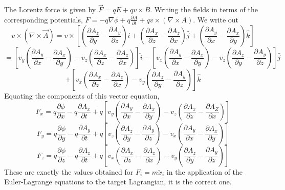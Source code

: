 \documentclass{article}
\begin{document}
The Lorentz force is given by $\vec{F}=qE+qv\times B$. Writing the fields in terms of the corresponding potentials,
$F=-q\nabla\phi+q\frac{\partial A}{\partial t}+qv\times(\nabla\times A)$.
We write out
\[v\times(\nabla\times\vec{A})=v\times\left[\left(\frac{\partial A_z}{\partial y}-\frac{\partial A_y}{\partial z}\right)\hat{i}+\left(\frac{\partial A_x}{\partial z}-\frac{\partial A_z}{\partial x}\right)\hat{j}+\left(\frac{\partial A_y}{\partial x}-\frac{\partial A_x}{\partial y}\right)\hat{k}\right]\]
\[=\left[ v_y\left(\frac{\partial A_y}{\partial x}-\frac{\partial A_x}{\partial y} \right)-v_z\left( \frac{\partial A_x}{\partial z}-\frac{\partial A_z}{\partial x} \right)\right]\hat{i}-\left[ v_x\left( \frac{\partial A_y}{\partial x}-\frac{\partial A_x}{\partial y}\right)-v_z\left(\frac{\partial A_z}{\partial y}-\frac{\partial A_y}{\partial z}\right) \right]\hat{j}\]
\[+\left[ v_x\left(  \frac{\partial A_x}{\partial z}-\frac{\partial A_z}{\partial x}\right)-v_y\left(\frac{\partial A_z}{\partial y}-\frac{\partial A_y}{\partial z}  \right) \right]\hat{k}\]
Equating the components of this vector equation,
\[F_x=q\frac{\partial \phi}{\partial x}-q\frac{\partial A_x}{\partial t}+q\left[ v_y\left( \frac{\partial A_y}{\partial x}-\frac{\partial A_x}{\partial y} \right)-v_z\left( \frac{\partial A_x}{\partial z}-\frac{\partial A_Z}{\partial x} \right) \right]\]
\[F_y=q\frac{\partial \phi}{\partial y}-q\frac{\partial A_y}{\partial t}+q\left[ v_z\left( \frac{\partial A_z}{\partial y}-\frac{\partial A_y}{\partial z} \right)-v_x\left( \frac{\partial A_y}{\partial x}-\frac{\partial A_x}{\partial y} \right) \right]\]
\[F_z=q\frac{\partial \phi}{\partial z}-q\frac{\partial A_z}{\partial t}+q\left[ v_x\left( \frac{\partial A_x}{\partial z}-\frac{\partial A_z}{\partial x} \right)-v_y\left( \frac{\partial A_z}{\partial y}-\frac{\partial A_y}{\partial z} \right) \right]\]
These are exactly the values obtained for $F_i=m\ddot{x}_i$ in the application of the Euler-Lagrange equations to the target Lagrangian, it is the correct one.
\end{document}
